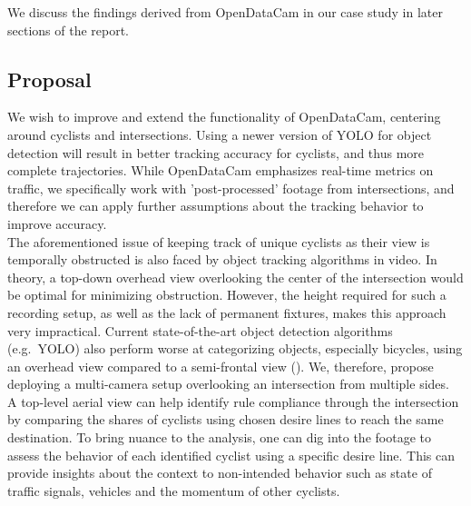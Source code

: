 We discuss the findings derived from OpenDataCam in our case study in later sections of the report.

\subsection{Proposal}
We wish to improve and extend the functionality of OpenDataCam, centering around cyclists and intersections.
Using a newer version of YOLO for object detection will result in better tracking accuracy for cyclists, 
and thus more complete trajectories.
While OpenDataCam emphasizes real-time metrics on traffic, we specifically work with 'post-processed' footage 
from intersections, and therefore we can apply further assumptions about the tracking behavior to improve accuracy.
\ \\

The aforementioned issue of keeping track of unique cyclists as their view is temporally obstructed is also faced by 
object tracking algorithms in video. In theory, a top-down overhead view overlooking the center of the 
intersection would be optimal for minimizing obstruction.
However, the height required for such a recording setup, as well as the lack of permanent fixtures, makes this 
approach very impractical. 
Current state-of-the-art object detection algorithms (e.g.~YOLO) also perform worse at categorizing objects, 
especially bicycles, using an overhead view compared to a semi-frontal view (\cite{overhead}). 
We, therefore, propose deploying a multi-camera setup overlooking an intersection from multiple sides.
\ \\

A top-level aerial view can help identify rule compliance through the intersection by comparing
the shares of cyclists using chosen desire lines to reach the same destination. 
To bring nuance to the analysis, one can dig into the footage to assess the behavior of 
each identified cyclist using a specific desire line. 
This can provide insights about the context to non-intended behavior such as state of traffic signals, 
vehicles and the momentum of other cyclists.